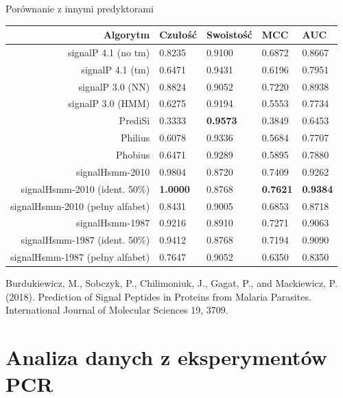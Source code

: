 \documentclass{beamer}\usepackage[]{graphicx}\usepackage[]{color}
\begin{document}
\begin{frame}{Porównanie z innymi predyktorami}

\begin{table}[H]
\centering
\small
\begin{tabular}{rllll}
  \toprule
Algorytm & Czułość & Swoistość & MCC & AUC \\ 
  \midrule
signalP 4.1 (no tm) & 0.8235 & 
0.9100 & 0.6872 & 
0.8667 \\ 
   \rowcolor[gray]{0.85}signalP 4.1 (tm) 
& 0.6471 & 
0.9431 & 0.6196 & 0.7951 \\ 
  signalP 3.0 (NN) & 0.8824 
& 0.9052 & 0.7220 & 
0.8938 \\ 
   \rowcolor[gray]{0.85}signalP 3.0 (HMM) 
 & 0.6275 & 
0.9194 & 0.5553 & 0.7734 \\ 
  PrediSi & 0.3333 & \textbf{0.9573} 
& 0.3849 & 0.6453 
\\ 
   \rowcolor[gray]{0.85}Philius 
& 0.6078 & 
0.9336 & 0.5684 & 0.7707 \\ 
  Phobius & 0.6471 & 0.9289 & 
0.5895 & 0.7880 \\ 
   \rowcolor[gray]{0.85}signalHsmm-2010 & 0.9804 & 0.8720 & 0.7409 & 0.9262 \\ 
  signalHsmm-2010 (ident. 50\%) & \textbf{1.0000} & 0.8768 & \textbf{0.7621} & 
\textbf{0.9384} \\ 
   \rowcolor[gray]{0.85}signalHsmm-2010 (pełny alfabet) & 0.8431 & 0.9005 & 0.6853 & 
0.8718 \\ 
  signalHsmm-1987 & 0.9216 & 0.8910 & 0.7271 & 0.9063 \\ 
   \rowcolor[gray]{0.85}signalHsmm-1987 (ident. 50\%) & 0.9412 & 0.8768 & 0.7194 
& 
0.9090 \\ 
  signalHsmm-1987 (pełny alfabet) & 0.7647 & 0.9052 & 0.6350 & 0.8350 \\ 
   \bottomrule
\end{tabular}
\end{table}

\tiny Burdukiewicz, M., Sobczyk, P., Chilimoniuk, J., Gagat, P., and Mackiewicz, P. (2018). Prediction of Signal Peptides in Proteins from Malaria Parasites. International Journal of Molecular Sciences 19, 3709.


\end{frame}

\section{Analiza danych z eksperymentów PCR}
\end{document}

